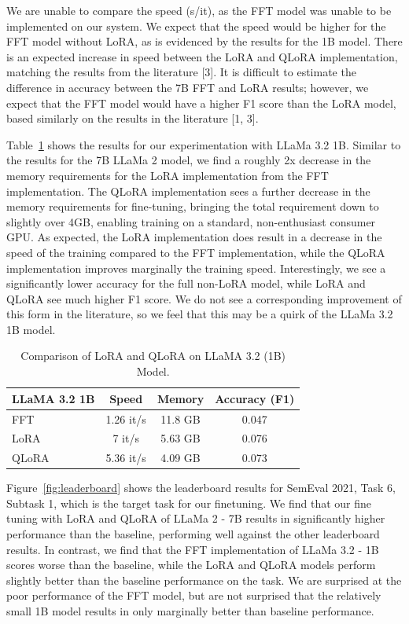 \documentclass[11pt]{article}
\begin{document}
We are unable to compare the speed (s/it), as the FFT model was unable to be implemented on our system. We expect that the speed would be higher for the FFT model without LoRA, as is evidenced by the results for the 1B model. There is an expected increase in speed between the LoRA and QLoRA implementation, matching the results from the literature [3]. It is difficult to estimate the difference in accuracy between the 7B FFT and LoRA results; however, we expect that the FFT model would have a higher F1 score than the LoRA model, based similarly on the results in the literature [1, 3].


Table~\ref*{tab:lora_qlora_3_2} shows the results for our experimentation with LLaMa 3.2 1B. Similar to the results for the 7B LLaMa 2 model, we find a roughly 2x decrease in the memory requirements for the LoRA implementation from the FFT implementation. The QLoRA implementation sees a further decrease in the memory requirements for fine-tuning, bringing the total requirement down to slightly over 4GB, enabling training on a standard, non-enthusiast consumer GPU. As expected, the LoRA implementation does result in a decrease in the speed of the training compared to the FFT implementation, while the QLoRA implementation improves marginally the training speed. Interestingly, we see a significantly lower accuracy for the full non-LoRA model, while LoRA and QLoRA see much higher F1 score. We do not see a corresponding improvement of this form in the literature, so we feel that this may be a quirk of the LLaMa 3.2 1B model.

\begin{table}[h]
	\centering
	\caption{Comparison of LoRA and QLoRA on LLaMA 3.2 (1B) Model.}
	\label{tab:lora_qlora_3_2}
	\begin{tabular}{|l|c|c|c|}
		\hline
		\textbf{LLaMA 3.2 1B} & \textbf{Speed} & \textbf{Memory} & \textbf{Accuracy (F1)} \\ \hline
		FFT   & 1.26 it/s & 11.8 GB & 0.047 \\ \hline
		LoRA  & 7 it/s    & 5.63 GB & 0.076 \\ \hline
		QLoRA & 5.36 it/s & 4.09 GB & 0.073 \\ \hline
	\end{tabular}
\end{table}


Figure~\ref{fig:leaderboard} shows the leaderboard results for SemEval 2021, Task 6, Subtask 1, which is the target task for our finetuning. We find that our fine tuning with LoRA and QLoRA of LLaMa 2 - 7B results in significantly higher performance than the baseline, performing well against the other leaderboard results. In contrast, we find that the FFT implementation of LLaMa 3.2 - 1B scores worse than the baseline, while the LoRA and QLoRA models perform slightly better than the baseline performance on the task. We are surprised at the poor performance of the FFT model, but are not surprised that the relatively small 1B model results in only marginally better than baseline performance.
\end{document}
